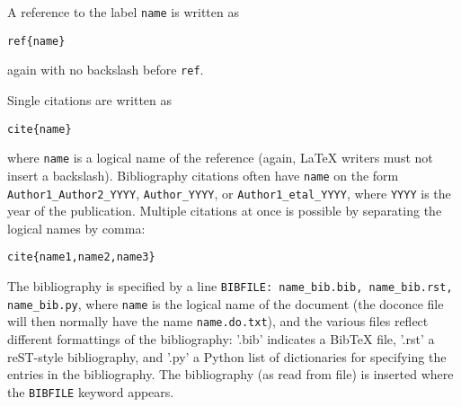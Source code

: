 \documentclass[twoside]{article}
\begin{document}
A reference to the label {\fontsize{10pt}{10pt}\verb!name!} is written as
\begin{Verbatim}
ref{name}
\end{Verbatim}
again with no backslash before {\fontsize{10pt}{10pt}\verb!ref!}.

Single citations are written as
\begin{Verbatim}
cite{name}
\end{Verbatim}
where {\fontsize{10pt}{10pt}\verb!name!} is a logical name
of the reference (again, {\LaTeX} writers must not insert a backslash).
Bibliography citations often have {\fontsize{10pt}{10pt}\verb!name!} on the form
{\fontsize{10pt}{10pt}\verb!Author1_Author2_YYYY!}, {\fontsize{10pt}{10pt}\verb!Author_YYYY!}, or {\fontsize{10pt}{10pt}\verb!Author1_etal_YYYY!}, where
{\fontsize{10pt}{10pt}\verb!YYYY!} is the year of the publication.
Multiple citations at once is possible by separating the logical names
by comma:
\begin{Verbatim}
cite{name1,name2,name3}
\end{Verbatim}

The bibliography is specified by a line {\fontsize{10pt}{10pt}\verb!BIBFILE: name_bib.bib, name_bib.rst, name_bib.py!}, where {\fontsize{10pt}{10pt}\verb!name!} is the logical name of the
document (the doconce file will then normally have the name
{\fontsize{10pt}{10pt}\verb!name.do.txt!}), and the various files reflect different formattings of
the bibliography: '.bib' indicates a BibTeX file, '.rst' a reST-style
bibliography, and '.py' a Python list of dictionaries for specifying
the entries in the bibliography. The bibliography (as read from file)
is inserted where the {\fontsize{10pt}{10pt}\verb!BIBFILE!} keyword appears.
\end{document}
